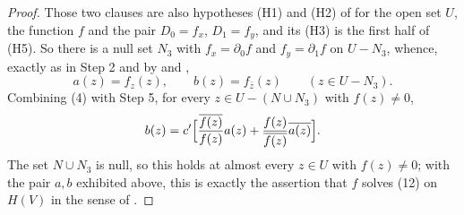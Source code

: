 \begin{proof}
Those two clauses are also hypotheses (H1) and (H2) of
 for the open set $U$, the function $f$ and the
pair $D_0=f_x$, $D_1=f_y$, and its (H3) is the first half of (H5).  So there is
a null set $N_3$ with $f_x=\partial_0f$ and $f_y=\partial_1f$ on $U-N_3$,
whence, exactly as in Step 2 and by  and ,
\begin{equation}\tag{4}
  a(z)=f_z(z),\qquad b(z)=f_{\bar z}(z)\qquad(z\in U-N_3).
\end{equation}
Combining (4) with Step 5, for every $z\in U-(N\cup N_3)$ with $f(z)\neq0$,
\[
  b(z)=c'\Bigl[\frac{\overline{f(z)}}{f(z)}a(z)
    +\frac{f(z)}{\overline{f(z)}}\overline{a(z)}\Bigr].
\]
The set $N\cup N_3$ is null, so this holds at almost every $z\in U$ with
$f(z)\neq0$; with the pair $a,b$ exhibited above, this is exactly the
assertion that $f$ solves (12) on $H(V)$ in the sense of .
\end{proof}
